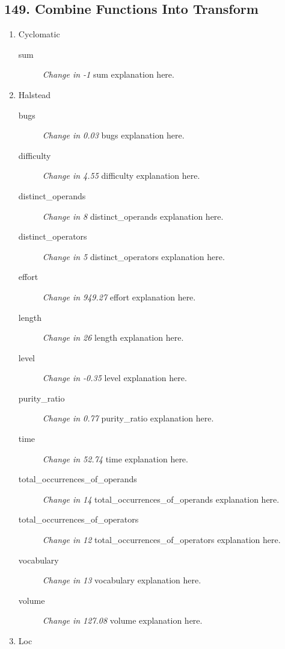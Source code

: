 \subsection{ 149.  Combine Functions Into Transform }

\begin{enumerate}
      \item Cyclomatic
            \begin{description}
                  \item [sum] \textit{Change in -1} sum explanation here.
            \end{description}
      \item Halstead
            \begin{description}
                  \item [bugs] \textit{Change in 0.03} bugs explanation here.
                  \item [difficulty] \textit{Change in 4.55} difficulty explanation here.
                  \item [distinct\_operands] \textit{Change in 8} distinct\_operands explanation here.
                  \item [distinct\_operators] \textit{Change in 5} distinct\_operators explanation here.
                  \item [effort] \textit{Change in 949.27} effort explanation here.
                  \item [length] \textit{Change in 26} length explanation here.
                  \item [level] \textit{Change in -0.35} level explanation here.
                  \item [purity\_ratio] \textit{Change in 0.77} purity\_ratio explanation here.
                  \item [time] \textit{Change in 52.74} time explanation here.
                  \item [total\_occurrences\_of\_operands] \textit{Change in 14} total\_occurrences\_of\_operands explanation here.
                  \item [total\_occurrences\_of\_operators] \textit{Change in 12} total\_occurrences\_of\_operators explanation here.
                  \item [vocabulary] \textit{Change in 13} vocabulary explanation here.
                  \item [volume] \textit{Change in 127.08} volume explanation here.
            \end{description}
      \item Loc

\end{enumerate}
